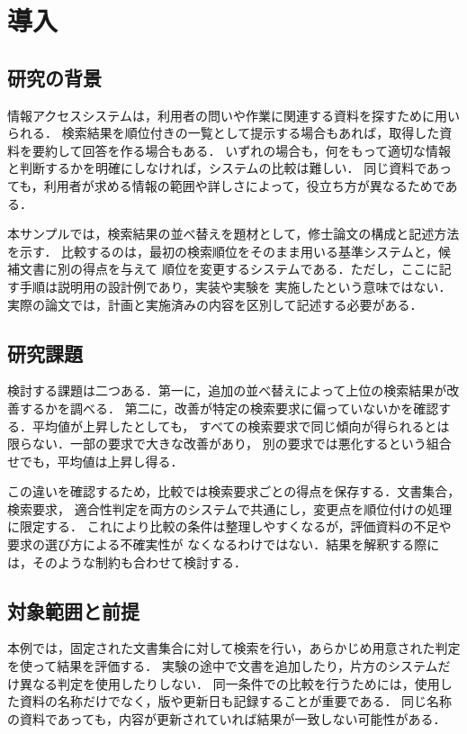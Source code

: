 \chapter{導入}
\label{sec:introduction}

\section{研究の背景}
情報アクセスシステムは，利用者の問いや作業に関連する資料を探すために用いられる．
検索結果を順位付きの一覧として提示する場合もあれば，取得した資料を要約して回答を作る場合もある．
いずれの場合も，何をもって適切な情報と判断するかを明確にしなければ，システムの比較は難しい．
同じ資料であっても，利用者が求める情報の範囲や詳しさによって，役立ち方が異なるためである．

本サンプルでは，検索結果の並べ替えを題材として，修士論文の構成と記述方法を示す．
比較するのは，最初の検索順位をそのまま用いる基準システムと，候補文書に別の得点を与えて
順位を変更するシステムである．ただし，ここに記す手順は説明用の設計例であり，実装や実験を
実施したという意味ではない．実際の論文では，計画と実施済みの内容を区別して記述する必要がある．

\section{研究課題}
検討する課題は二つある．第一に，追加の並べ替えによって上位の検索結果が改善するかを調べる．
第二に，改善が特定の検索要求に偏っていないかを確認する．平均値が上昇したとしても，
すべての検索要求で同じ傾向が得られるとは限らない．一部の要求で大きな改善があり，
別の要求では悪化するという組合せでも，平均値は上昇し得る．

この違いを確認するため，比較では検索要求ごとの得点を保存する．文書集合，検索要求，
適合性判定を両方のシステムで共通にし，変更点を順位付けの処理に限定する．
これにより比較の条件は整理しやすくなるが，評価資料の不足や要求の選び方による不確実性が
なくなるわけではない．結果を解釈する際には，そのような制約も合わせて検討する．

\newpage
\section{対象範囲と前提}
\label{sec:scope}
本例では，固定された文書集合に対して検索を行い，あらかじめ用意された判定を使って結果を評価する．
実験の途中で文書を追加したり，片方のシステムだけ異なる判定を使用したりしない．
同一条件での比較を行うためには，使用した資料の名称だけでなく，版や更新日も記録することが重要である．
同じ名称の資料であっても，内容が更新されていれば結果が一致しない可能性がある．

